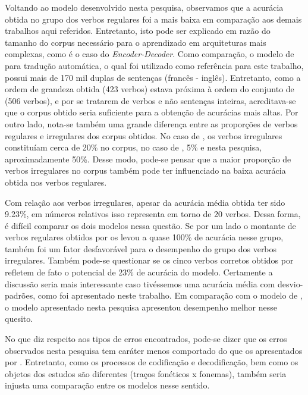 Voltando ao modelo desenvolvido nesta pesquisa, observamos que a acurácia obtida no grupo dos verbos regulares foi a mais baixa em comparação aos demais trabalhos aqui referidos. Entretanto, isto pode ser explicado em razão do tamanho do corpus necessário para o aprendizado em arquiteturas mais complexas, como é o caso do \textit{Encoder-Decoder}. Como comparação, o modelo de \cite{cholletseq2seq} para tradução automática, o qual foi utilizado como referência para este trabalho, possui mais de 170 mil duplas de sentenças (francês - inglês). Entretanto, como a ordem de grandeza obtida (423 verbos) estava próxima à ordem do conjunto de \cite{rumelhart:1986} (506 verbos), e por se tratarem de verbos e não sentenças inteiras, acreditava-se que o corpus obtido seria suficiente para a obtenção de acurácias mais altas. Por outro lado, nota-se também uma grande diferença entre as proporções de verbos regulares e irregulares dos corpus obtidos. No caso de \cite{rumelhart:1986}, os verbos irregulares constituíam cerca de 20\% no corpus, no caso de \cite{kirov:2018}, 5\% e nesta pesquisa, aproximadamente 50\%. Desse modo, pode-se pensar que a maior proporção de verbos irregulares no corpus também pode ter influenciado na baixa acurácia obtida nos verbos regulares. 

Com relação aos verbos irregulares, apesar da acurácia média obtida ter sido 9.23\%, em números relativos isso representa em torno de 20 verbos. Dessa forma, é difícil comparar os dois modelos nessa questão. Se por um lado o montante de verbos regulares obtidos por \cite{kirov:2018} os levou a quase 100\% de acurácia nesse grupo, também foi um fator desfavorável para o desempenho do grupo dos verbos irregulares. Também pode-se questionar se os cinco verbos corretos obtidos por \cite{kirov:2018} refletem de fato o potencial de 23\% de acurácia do modelo. Certamente a discussão seria mais interessante caso tivéssemos uma acurácia média com desvio-padrões, como foi apresentado neste trabalho. Em comparação com o modelo de \cite{Albright2003RulesVA}, o modelo apresentado nesta pesquisa apresentou desempenho melhor nesse quesito. 

No que diz respeito aos tipos de erros encontrados, pode-se dizer que os erros observados nesta pesquisa tem caráter menos comportado do que os apresentados por \cite{kirov:2018}. Entretanto, como os processos de codificação e decodificação, bem como os objetos dos estudos são diferentes (traços fonéticos x fonemas), também seria injusta uma comparação entre os modelos nesse sentido.

